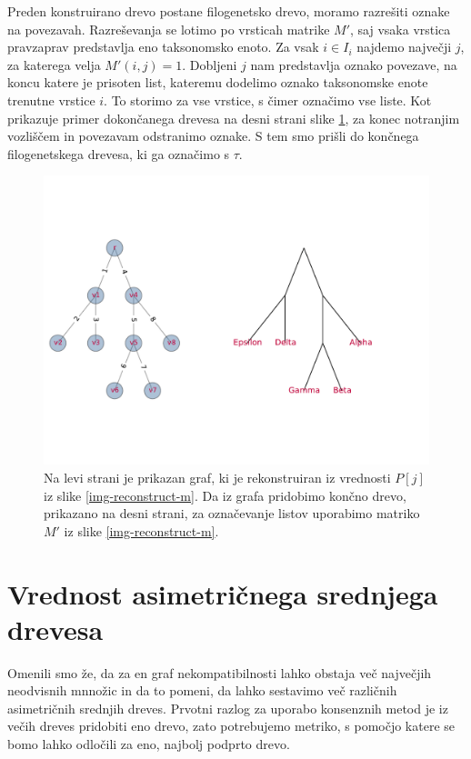 \documentclass[a4paper, 12pt]{book}
\begin{document}
Preden konstruirano drevo postane filogenetsko drevo, moramo razrešiti oznake na povezavah. Razreševanja se lotimo po vrsticah matrike $M'$, saj vsaka vrstica pravzaprav predstavlja eno taksonomsko enoto. Za vsak $i \in I_i$ najdemo največji $j$, za katerega velja $M'(i, j) = 1$. Dobljeni $j$ nam predstavlja oznako povezave, na koncu katere je prisoten list, kateremu dodelimo oznako taksonomske enote trenutne vrstice $i$. To storimo za vse vrstice, s čimer označimo vse liste. Kot prikazuje primer dokončanega drevesa na desni strani slike \ref{img-reconstruct-1}, za konec notranjim vozliščem in povezavam odstranimo oznake. S tem smo prišli do končnega filogenetskega drevesa, ki ga označimo s $\tau$.  

\begin{figure}
	\begin{center}
		\includegraphics[scale=0.74, clip=true, trim=0 3cm 3cm 3cm]{gfx/tree_reconstruct_1.pdf}
	\end{center}
	\caption{Na levi strani je prikazan graf, ki je rekonstruiran iz vrednosti $P[j]$ iz slike \ref{img-reconstruct-m}. Da iz grafa pridobimo končno drevo, prikazano na desni strani, za označevanje listov uporabimo matriko $M'$ iz slike \ref{img-reconstruct-m}.}
	\label{img-reconstruct-1}
\end{figure}

\section{Vrednost asimetričnega srednjega drevesa}
Omenili smo že, da za en graf nekompatibilnosti lahko obstaja več največjih neodvisnih mnnožic in da to pomeni, da lahko sestavimo več različnih asimetričnih srednjih dreves. Prvotni razlog za uporabo konsenznih metod je iz večih dreves pridobiti eno drevo, zato potrebujemo metriko, s pomočjo katere se bomo lahko odločili za eno, najbolj podprto drevo.  
\end{document}
